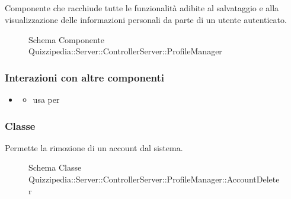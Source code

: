 \subsection{}
Componente che racchiude tutte le funzionalità adibite al salvataggio e alla visualizzazione delle informazioni personali da parte di un utente autenticato.
\begin{figure}[H]
\centering
\noindent{}
\caption[Schema Componente Quizzipedia::Server::ControllerServer::ProfileManager]{Schema Componente Quizzipedia::Server::ControllerServer::ProfileManager}
\end{figure}
\subsubsection{Interazioni con altre componenti}
\begin{itemize}
\item {}
\begin{itemize}
\item usa  per 
\end{itemize}
\end{itemize}
\subsubsection{Classe }
Permette la rimozione di un account dal sistema.
\begin{figure}[H]
\centering
\noindent{}
\caption[Schema Classe AccountDeleter]{Schema Classe Quizzipedia::Server::ControllerServer::ProfileManager::AccountDeleter}
\end{figure}
